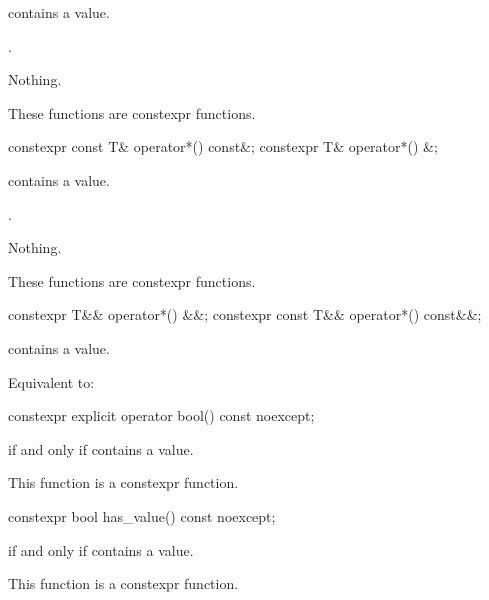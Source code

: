 \begin{itemdescr}
\pnum
\expects
{} contains a value.

\pnum
\returns
{}.

\pnum
\throws
Nothing.

\pnum
\remarks
These functions are constexpr functions.
\end{itemdescr}

%
\begin{itemdecl}
constexpr const T& operator*() const&;
constexpr T& operator*() &;
\end{itemdecl}

\begin{itemdescr}
\pnum
\expects
{} contains a value.

\pnum
\returns
{}.

\pnum
\throws
Nothing.

\pnum
\remarks
These functions are constexpr functions.
\end{itemdescr}

%
\begin{itemdecl}
constexpr T&& operator*() &&;
constexpr const T&& operator*() const&&;
\end{itemdecl}

\begin{itemdescr}
\pnum
\expects
{} contains a value.

\pnum
\effects
Equivalent to: 
\end{itemdescr}

%
\begin{itemdecl}
constexpr explicit operator bool() const noexcept;
\end{itemdecl}

\begin{itemdescr}
\pnum
\returns
{} if and only if  contains a value.

\pnum
\remarks
This function is a constexpr function.
\end{itemdescr}

%
\begin{itemdecl}
constexpr bool has_value() const noexcept;
\end{itemdecl}

\begin{itemdescr}
\pnum
\returns
{} if and only if  contains a value.

\pnum
\remarks
This function is a constexpr function.
\end{itemdescr}

